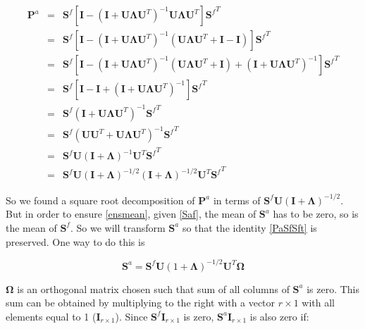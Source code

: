 \documentclass[a4paper,12pt]{article}
\begin{document}
\begin{eqnarray}
\mathbf{P}^a
&=&
\mathbf S^f
\left[
\mathbf I - 
(\mathbf I+ \mathbf U \mathbf \Lambda \mathbf U^T )^{-1}\mathbf U \mathbf \Lambda \mathbf U^T
\right]
{\mathbf S^f}^T\\
&=&
\mathbf S^f
\left[
\mathbf I - 
(\mathbf I+ \mathbf U \mathbf \Lambda \mathbf U^T )^{-1}
\left( \mathbf U \mathbf \Lambda \mathbf U^T + \mathbf I - \mathbf I\right) 
\right]
{\mathbf S^f}^T\\
&=&
\mathbf S^f
\left[
\mathbf I - 
(\mathbf I+ \mathbf U \mathbf \Lambda \mathbf U^T )^{-1}
\left( \mathbf U \mathbf \Lambda \mathbf U^T + \mathbf I \right) 
 +
(\mathbf I+ \mathbf U \mathbf \Lambda \mathbf U^T )^{-1}
\right]
{\mathbf S^f}^T\\
&=&
\mathbf S^f
\left[
\mathbf I - 
\mathbf I 
 + 
(\mathbf I+ \mathbf U \mathbf \Lambda \mathbf U^T )^{-1}
\right]
{\mathbf S^f}^T \\
&=&
\mathbf S^f
(\mathbf I+ \mathbf U \mathbf \Lambda \mathbf U^T )^{-1}
{\mathbf S^f}^T \\
&=&
\mathbf S^f
(\mathbf U \mathbf U^T+ \mathbf U \mathbf \Lambda \mathbf U^T )^{-1}
{\mathbf S^f}^T \\
&=&
\mathbf S^f \mathbf U
(\mathbf I + \mathbf \Lambda )^{-1}
\mathbf U^T {\mathbf S^f}^T \\
&=&
\mathbf S^f \mathbf U
(\mathbf I + \mathbf \Lambda )^{-1/2}
(\mathbf I + \mathbf \Lambda )^{-1/2}
\mathbf U^T {\mathbf S^f}^T \label{PaSfSft}
\end{eqnarray}

So we found a square root decomposition of $\mathbf{P}^a$ in terms of $\mathbf{S}^f\mathbf{U}(\mathbf I + \mathbf \Lambda)^{-1/2}$. But  in order to ensure \eqref{ensmean}, given \eqref{Saf}, the mean of $\mathbf S^a$ has to be zero, so is the mean of $\mathbf S^f$. So we will transform $\mathbf S^a$ so that the identity \eqref{PaSfSft} is preserved. One way to do this is

\begin{equation}
   \mathbf S^a = \mathbf S^f \mathbf U (1+ \mathbf \Lambda)^{-1/2} \mathbf U^T \mathbf \Omega
\end{equation}

\newcommand{\one}{ \mathbf I_{r \times 1}}

$\mathbf \Omega$ is an orthogonal matrix chosen such that sum of all columns of $\mathbf S^a$ is zero. This sum can be obtained by multiplying to the right with a vector $r \times 1$ with all elements equal to 1 ($\one$). Since $\mathbf S^f \one$ is zero, $\mathbf S^a \one$ is also zero if:
\end{document}
